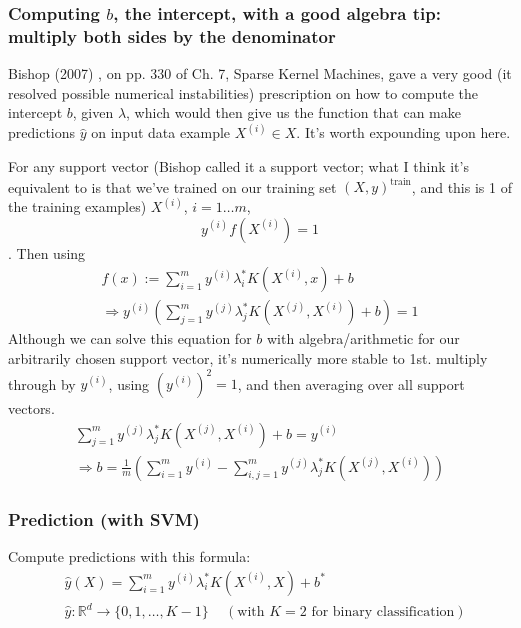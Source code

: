 \documentclass[10pt]{amsart}
\begin{document}
\begin{multicols*}{2}
\subsubsection{Computing $b$, the intercept, with a good algebra tip: multiply both sides by the denominator}\label{SubSec:binterceptcompute}

Bishop (2007) \cite{Bish2007}, on pp. 330 of Ch. 7, Sparse Kernel Machines,  gave a very good (it resolved possible numerical instabilities) prescription on how to compute the intercept $b$, given $\lambda$, which would then give us the function that can make predictions $\widehat{y}$ on input data example $X^{(i)} \in X$.  It's worth expounding upon here.  

For any support vector (Bishop called it a support vector; what I think it's equivalent to is that we've trained on our training set $(X,y)^{\text{train}}$, and this is 1 of the training examples) $X^{(i)}$, $i=1\dots m$,
\begin{equation}
  y^{(i)}f(X^{(i)}) =1
  \end{equation}.  Then using
\begin{equation}
\begin{gathered}
  f(x):=\sum_{i=1}^m y^{(i)} \lambda_i^* K(X^{(i)},x) + b \\
  \Longrightarrow y^{(i)} \left( \sum_{j=1}^m y^{(j)} \lambda_j^* K(X^{(j)},X^{(i)} ) + b \right) = 1
  \end{gathered}
  \end{equation}
Although we can solve this equation for $b$ with algebra/arithmetic for our arbitrarily chosen support vector, it's numerically more stable to 1st. multiply through by $y^{(i)}$, using $(y^{(i)})^2 =1$, and then averaging over all support vectors.
\begin{equation}\label{Eq:bintercept}
  \begin{gathered}
    \sum_{j=1}^m y^{(j)}\lambda_j^* K(X^{(j)},X^{(i)}) +b = y^{(i)} \\
    \Longrightarrow b= \frac{1}{m} \left( \sum_{i=1}^m y^{(i)} - \sum_{i,j=1}^m y^{(j)} \lambda_j^* K(X^{(j)}, X^{(i)}) \right)
    \end{gathered}
  \end{equation}

\subsubsection{Prediction (with SVM)} \label{SubSec:Predictioncompute}
Compute predictions with this formula: \cite{CFZ2009}
\begin{equation}\label{Eq:predictyhat}
  \begin{aligned}
    & \widehat{y}(X) = \sum_{i=1}^m y^{(i)} \lambda_i^* K(X^{(i)}, X) + b^* \\ 
    & \widehat{y}:\mathbb{R}^d \to \lbrace 0 ,1 , \dots , K-1 \rbrace \quad \, (\text{with $K=2$ for binary classification})
    \end{aligned}
  \end{equation}






\end{multicols*}
\end{document}
